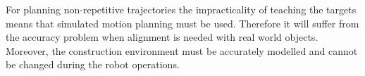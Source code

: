 For planning non-repetitive trajectories the impracticality of teaching the targets means that simulated motion planning must be used. Therefore it will suffer from the accuracy problem when alignment is needed with real world objects. Moreover, the construction environment must be accurately modelled and cannot be changed during the robot operations. 
